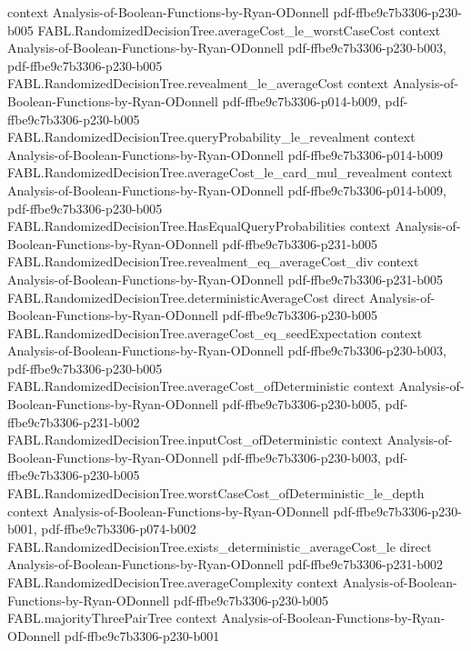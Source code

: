 \begin{theorem}
  {context}
  {Analysis-of-Boolean-Functions-by-Ryan-ODonnell}
  {pdf-ffbe9c7b3306-p230-b005}
\proofstep
  {FABL.RandomizedDecisionTree.averageCost_le_worstCaseCost}
  {context}
  {Analysis-of-Boolean-Functions-by-Ryan-ODonnell}
  {pdf-ffbe9c7b3306-p230-b003,
    pdf-ffbe9c7b3306-p230-b005}
\proofstep
  {FABL.RandomizedDecisionTree.revealment_le_averageCost}
  {context}
  {Analysis-of-Boolean-Functions-by-Ryan-ODonnell}
  {pdf-ffbe9c7b3306-p014-b009,
    pdf-ffbe9c7b3306-p230-b005}
\proofstep
  {FABL.RandomizedDecisionTree.queryProbability_le_revealment}
  {context}
  {Analysis-of-Boolean-Functions-by-Ryan-ODonnell}
  {pdf-ffbe9c7b3306-p014-b009}
\proofstep
  {FABL.RandomizedDecisionTree.averageCost_le_card_mul_revealment}
  {context}
  {Analysis-of-Boolean-Functions-by-Ryan-ODonnell}
  {pdf-ffbe9c7b3306-p014-b009,
    pdf-ffbe9c7b3306-p230-b005}
\proofstep
  {FABL.RandomizedDecisionTree.HasEqualQueryProbabilities}
  {context}
  {Analysis-of-Boolean-Functions-by-Ryan-ODonnell}
  {pdf-ffbe9c7b3306-p231-b005}
\proofstep
  {FABL.RandomizedDecisionTree.revealment_eq_averageCost_div}
  {context}
  {Analysis-of-Boolean-Functions-by-Ryan-ODonnell}
  {pdf-ffbe9c7b3306-p231-b005}
\proofstep
  {FABL.RandomizedDecisionTree.deterministicAverageCost}
  {direct}
  {Analysis-of-Boolean-Functions-by-Ryan-ODonnell}
  {pdf-ffbe9c7b3306-p230-b005}
\proofstep
  {FABL.RandomizedDecisionTree.averageCost_eq_seedExpectation}
  {context}
  {Analysis-of-Boolean-Functions-by-Ryan-ODonnell}
  {pdf-ffbe9c7b3306-p230-b003,
    pdf-ffbe9c7b3306-p230-b005}
\proofstep
  {FABL.RandomizedDecisionTree.averageCost_ofDeterministic}
  {context}
  {Analysis-of-Boolean-Functions-by-Ryan-ODonnell}
  {pdf-ffbe9c7b3306-p230-b005,
    pdf-ffbe9c7b3306-p231-b002}
\proofstep
  {FABL.RandomizedDecisionTree.inputCost_ofDeterministic}
  {context}
  {Analysis-of-Boolean-Functions-by-Ryan-ODonnell}
  {pdf-ffbe9c7b3306-p230-b003,
    pdf-ffbe9c7b3306-p230-b005}
\proofstep
  {FABL.RandomizedDecisionTree.worstCaseCost_ofDeterministic_le_depth}
  {context}
  {Analysis-of-Boolean-Functions-by-Ryan-ODonnell}
  {pdf-ffbe9c7b3306-p230-b001,
    pdf-ffbe9c7b3306-p074-b002}
\proofstep
  {FABL.RandomizedDecisionTree.exists_deterministic_averageCost_le}
  {direct}
  {Analysis-of-Boolean-Functions-by-Ryan-ODonnell}
  {pdf-ffbe9c7b3306-p231-b002}
\proofstep
  {FABL.RandomizedDecisionTree.averageComplexity}
  {context}
  {Analysis-of-Boolean-Functions-by-Ryan-ODonnell}
  {pdf-ffbe9c7b3306-p230-b005}
\proofstep
  {FABL.majorityThreePairTree}
  {context}
  {Analysis-of-Boolean-Functions-by-Ryan-ODonnell}
  {pdf-ffbe9c7b3306-p230-b001}

\end{theorem}
